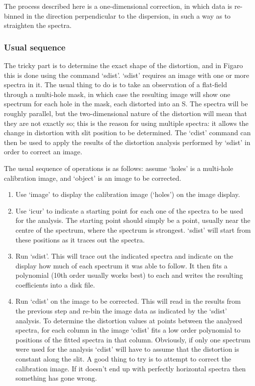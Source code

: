 \documentclass[11pt,twoside]{article}
\begin{document}
   The process described here is a one-dimensional correction, in which
   data is re-binned in the direction perpendicular to the dispersion, in
   such a way as to straighten the spectra.


\subsubsection{\label{techno7usual}Usual sequence}

   The tricky part is to determine the exact shape of the distortion,
   and in Figaro this is done using the command `sdist'.  `sdist'
   requires an image with one or more spectra in it.  The usual thing to
   do is to take an observation of a flat-field through a multi-hole
   mask, in which case the resulting image will show one spectrum for
   each hole in the mask, each distorted into an S. The spectra will be
   roughly parallel, but the two-dimensional nature of the distortion
   will mean that they are not exactly so; this is the reason for using
   multiple spectra: it allows the change in distortion with slit
   position to be determined.  The `cdist' command can then be used to
   apply the results of the distortion analysis performed by `sdist' in
   order to correct an image.

   The usual sequence of operations is as follows: assume `holes' is a
   multi-hole calibration image, and `object' is an image to be
   corrected.

\begin{enumerate}
\item
   Use `image' to display the calibration image (`holes') on the image
   display.
\item
   Use `icur' to indicate a starting point for each one of the spectra
   to be used for the analysis.  The starting point should simply be a
   point, usually near the centre of the spectrum, where the spectrum is
   strongest. `sdist' will start from these positions as it traces out
   the spectra.
\item
   Run `sdist'.  This will trace out the indicated spectra and indicate
   on the display how much of each spectrum it was able to follow.  It
   then fits a polynomial (10th order usually works best) to each and
   writes the resulting coefficients into a disk file.
\item
   Run `cdist' on the image to be corrected.  This will read in the
   results from the previous step and re-bin the image data as indicated
   by the `sdist' analysis.  To determine the distortion values at points
   between the analysed spectra, for each column in the image `cdist'
   fits a low order polynomial to positions of the fitted spectra in
   that column.  Obviously, if only one spectrum were used for the analysis
   `cdist' will have to assume that the distortion is constant along the
   slit. A good thing to try is to attempt to correct the calibration
   image.  If it doesn't end up with perfectly horizontal spectra then
   something has gone wrong.
\end{enumerate}
\end{document}
